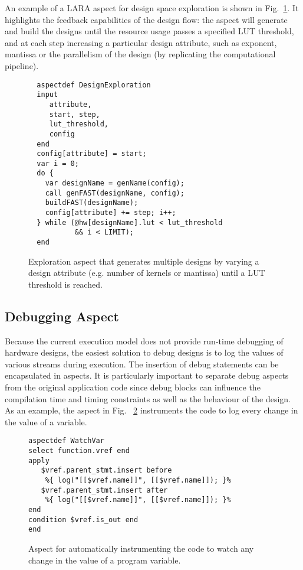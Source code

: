 An example of a LARA aspect for design space exploration is
shown in Fig.~\ref{fig:aspect-exploration}. It highlights the feedback capabilities of the design
flow: the aspect will generate and build the \MAXC{} designs until the
resource usage passes a specified LUT threshold, and at each step
increasing a particular design attribute, such as exponent, mantissa or the parallelism of the design (by replicating the computational pipeline).

\lstset{style=lara}
\begin{figure}[!h]
\begin{lstlisting}
  aspectdef DesignExploration
  input
     attribute,
     start, step,
     lut_threshold,
     config
  end
  config[attribute] = start;
  var i = 0;
  do {
    var designName = genName(config);
    call genFAST(designName, config);
    buildFAST(designName);
    config[attribute] += step; i++;
  } while (@hw[designName].lut < lut_threshold
           && i < LIMIT);
  end
\end{lstlisting}
\caption{Exploration aspect that generates multiple \MAXC{} designs by varying a design attribute (e.g. number of kernels or mantissa) until a LUT threshold is reached.}
\label{fig:aspect-exploration}
\end{figure}


\subsection{Debugging Aspect}
\label{sect:asp_debug}
Because the current execution model does not provide run-time debugging
of hardware designs, the easiest solution to debug designs is to log
the values of various streams during execution. The insertion of debug
statements can be encapsulated in aspects. It is particularly
important to separate debug aspects from the original application code
since debug blocks can influence the compilation time and timing
constraints as well as the behaviour of the design. As an example,
the aspect in Fig. ~\ref{fig:aspect-debug} instruments the code to log every change in the value of a variable.

\lstset{style=lara}
\begin{figure}[!h]
  \centering
\begin{lstlisting}
aspectdef WatchVar
select function.vref end
apply
   $vref.parent_stmt.insert before
    %{ log("[[$vref.name]]", [[$vref.name]]); }%
   $vref.parent_stmt.insert after
    %{ log("[[$vref.name]]", [[$vref.name]]); }%
end
condition $vref.is_out end
end
\end{lstlisting}
  \caption{Aspect for automatically instrumenting the code to watch any change in the value of a program variable.}
  \label{fig:aspect-debug}
\end{figure}
